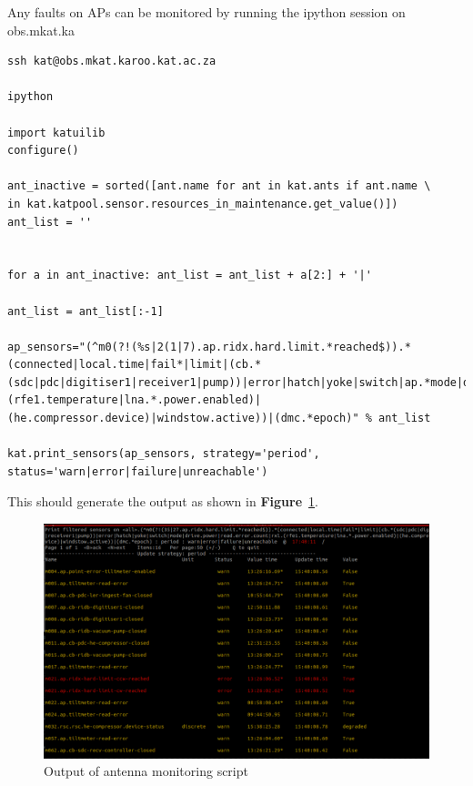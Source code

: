 Any faults on APs can be monitored by running the ipython session on obs.mkat.ka
\begin{lstlisting}[style=DOS]
ssh kat@obs.mkat.karoo.kat.ac.za

ipython

import katuilib
configure()

ant_inactive = sorted([ant.name for ant in kat.ants if ant.name \
in kat.katpool.sensor.resources_in_maintenance.get_value()])
ant_list = ''


for a in ant_inactive: ant_list = ant_list + a[2:] + '|'

ant_list = ant_list[:-1]

ap_sensors="(^m0(?!(%s|2(1|7).ap.ridx.hard.limit.*reached$)).*(connected|local.time|fail*|limit|(cb.*(sdc|pdc|digitiser1|receiver1|pump))|error|hatch|yoke|switch|ap.*mode|drive.power|read.error.count|rxl.(rfe1.temperature|lna.*.power.enabled)|(he.compressor.device)|windstow.active))|(dmc.*epoch)" % ant_list

kat.print_sensors(ap_sensors, strategy='period', status='warn|error|failure|unreachable')
\end{lstlisting}




This should generate the output as shown in \textbf{Figure}~\ref{fig:image124}.



\begin{figure}[H]
	\centering
	\includegraphics[scale=0.23]{Chapters/images/image124.png}
	
	\caption{Output of antenna monitoring script}
	\label{fig:image124}
\end{figure}


